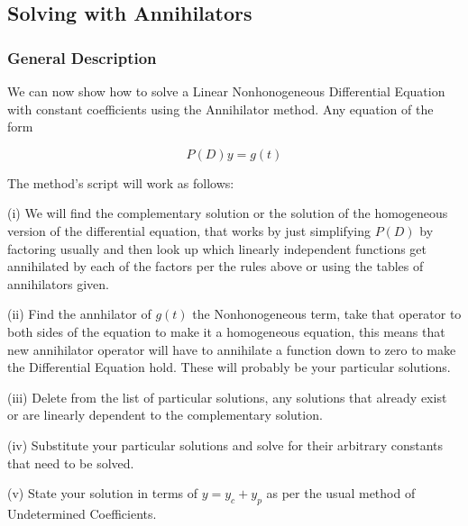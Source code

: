 \documentclass[12pt]{article}
\begin{document}
\subsection{Solving with Annihilators}

\subsubsection{General Description}

We can now show how to solve a Linear Nonhonogeneous Differential Equation with constant coefficients using the Annihilator method. Any equation of the form

\begin{equation*}
    P(D)y=g(t)
\end{equation*}

The method's script will work as follows:

\vspace{10pt}

(i) We will find the complementary solution or the solution of the homogeneous version of the differential equation, that works by just simplifying $P(D)$ by factoring usually and then look up which linearly independent functions get annihilated by each of the factors per the rules above or using the tables of annihilators given.

\vspace{10pt}

(ii) Find the annhilator of $g(t)$ the Nonhonogeneous term, take that operator to both sides of the equation to make it a homogeneous equation, this means that new annihilator operator will have to annihilate a function down to zero to make the Differential Equation hold. These will probably be your particular solutions.

\vspace{10pt}

(iii) Delete from the list of particular solutions, any solutions that already exist or are linearly dependent to the complementary solution.

\vspace{10pt}

(iv) Substitute your particular solutions and solve for their arbitrary constants that need to be solved.

\vspace{10pt}

(v) State your solution in terms of $y=y_c+y_p$ as per the usual method of Undetermined Coefficients.
\end{document}
